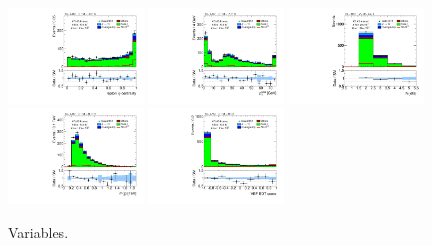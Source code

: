 \begin{figure}[tp]
  \includegraphics[width=0.32\textwidth]{figures/analysis/vbf-WlvCR/lep-eta-centrality}
  \includegraphics[width=0.32\textwidth]{figures/analysis/vbf-WlvCR/system-pt}
  \includegraphics[width=0.32\textwidth]{figures/analysis/vbf-WlvCR/n-jets30}
  \includegraphics[width=0.32\textwidth]{figures/analysis/vbf-WlvCR/dijet-m-veryhigh}
  \includegraphics[width=0.32\textwidth]{figures/analysis/vbf-WlvCR/BDTEve-VBF}
  \caption{Variables.}
  \label{fig:backgrounds-WlvCR-jets}
\end{figure}

